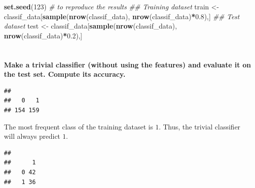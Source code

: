 \documentclass[
  12pt,
  oneside]{report}
\newenvironment{Shaded}{\begin{snugshade}}{\end{snugshade}}
\newcommand{\CommentTok}[1]{\textcolor[rgb]{0.56,0.35,0.01}{\textit{#1}}}
\newcommand{\DecValTok}[1]{\textcolor[rgb]{0.00,0.00,0.81}{#1}}
\newcommand{\FloatTok}[1]{\textcolor[rgb]{0.00,0.00,0.81}{#1}}
\newcommand{\KeywordTok}[1]{\textcolor[rgb]{0.13,0.29,0.53}{\textbf{#1}}}
\newcommand{\NormalTok}[1]{#1}
\newcommand{\OperatorTok}[1]{\textcolor[rgb]{0.81,0.36,0.00}{\textbf{#1}}}
\newcommand{\StringTok}[1]{\textcolor[rgb]{0.31,0.60,0.02}{#1}}
\begin{document}
\begin{Shaded}
\begin{Highlighting}[]
\KeywordTok{set.seed}\NormalTok{(}\DecValTok{123}\NormalTok{) }\CommentTok{# to reproduce the results}
\CommentTok{## Training dataset}
\NormalTok{train <-}\StringTok{ }\NormalTok{classif_data[}\KeywordTok{sample}\NormalTok{(}\KeywordTok{nrow}\NormalTok{(classif_data), }\KeywordTok{nrow}\NormalTok{(classif_data)}\OperatorTok{*}\FloatTok{0.8}\NormalTok{),]}
\CommentTok{## Test dataset}
\NormalTok{test <-}\StringTok{ }\NormalTok{classif_data[}\KeywordTok{sample}\NormalTok{(}\KeywordTok{nrow}\NormalTok{(classif_data), }\KeywordTok{nrow}\NormalTok{(classif_data)}\OperatorTok{*}\FloatTok{0.2}\NormalTok{),]}
\end{Highlighting}
\end{Shaded}

\hypertarget{section-4}{%
\section{}\label{section-4}}

\textbf{Make a trivial classifier (without using the features) and evaluate it on the test set. Compute its accuracy.}

\begin{Shaded}
\end{Shaded}

\begin{verbatim}
## 
##   0   1 
## 154 159
\end{verbatim}

The most frequent class of the training dataset is \(1\). Thus, the trivial classifier will always predict \(1\).

\begin{Shaded}
\end{Shaded}

\begin{verbatim}
##    
##      1
##   0 42
##   1 36
\end{verbatim}
\end{document}
